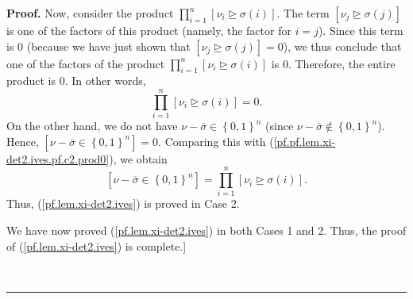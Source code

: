 \documentclass
[numbers=enddot,12pt,final,onecolumn,notitlepage,english]{scrartcl}%
\theoremstyle{definition}
\newenvironment{proof}[1][Proof]{\noindent\textbf{#1.} }{\ \rule{0.5em}{0.5em}}
\let\prodnonlimits\prod
\renewcommand{\prod}{\prodnonlimits\limits}
\newenvironment{verlong}{}{}
\begin{document}
\begin{verlong}
\begin{proof}
Now, consider the product $\prod_{i=1}^{n}\left[  \nu_{i}\trianglerighteq
\sigma\left(  i\right)  \right]  $. The term $\left[  \nu_{j}\trianglerighteq
\sigma\left(  j\right)  \right]  $ is one of the factors of this product
(namely, the factor for $i=j$). Since this term is $0$ (because we have just
shown that $\left[  \nu_{j}\trianglerighteq\sigma\left(  j\right)  \right]
=0$), we thus conclude that one of the factors of the product $\prod_{i=1}%
^{n}\left[  \nu_{i}\trianglerighteq\sigma\left(  i\right)  \right]  $ is $0$.
Therefore, the entire product is $0$. In other words,
\begin{equation}
\prod_{i=1}^{n}\left[  \nu_{i}\trianglerighteq\sigma\left(  i\right)  \right]
=0. \label{pf.pf.lem.xi-det2.ives.pf.c2.prod0}%
\end{equation}
On the other hand, we do not have $\nu-\overline{\sigma}\in\left\{
0,1\right\}  ^{n}$ (since $\nu-\overline{\sigma}\notin\left\{  0,1\right\}
^{n}$). Hence, $\left[  \nu-\overline{\sigma}\in\left\{  0,1\right\}
^{n}\right]  =0$. Comparing this with
(\ref{pf.pf.lem.xi-det2.ives.pf.c2.prod0}), we obtain%
\[
\left[  \nu-\overline{\sigma}\in\left\{  0,1\right\}  ^{n}\right]
=\prod_{i=1}^{n}\left[  \nu_{i}\trianglerighteq\sigma\left(  i\right)
\right]  .
\]
Thus, (\ref{pf.lem.xi-det2.ives}) is proved in Case 2. \medskip

We have now proved (\ref{pf.lem.xi-det2.ives}) in both Cases 1 and 2. Thus,
the proof of (\ref{pf.lem.xi-det2.ives}) is complete.] \medskip


\end{proof}
\end{verlong}
\end{document}
